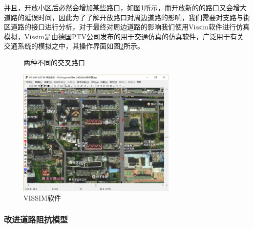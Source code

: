 \documentclass[fontset=windows,a4paper,12pt]{ctexart}
\begin{document}
			并且，开放小区后必然会增加某些路口，如图\ref{fig:cross_t}所示，而开放新的的路口又会增大道路的延误时间，因此为了了解开放路口对周边道路的影响，我们需要对支路与街区道路的接口进行分析，对于最终对周边道路的影响我们使用Vissim软件进行仿真模拟，Vissim是由德国PTV公司发布的用于交通仿真的仿真软件，广泛用于有关交通系统的模拟之中，其操作界面如图\ref{fig:vissim_ui}所示。
			\begin{figure}[!htbp]
				\centering
				\caption{两种不同的交叉路口}
				\label{fig:cross_t}
			\end{figure}
			\begin{figure}[!htbp]
				\centering
				\includegraphics[width=0.7\textwidth]{pic/vissim_ui.jpg}
				\caption{VISSIM软件}
				\label{fig:vissim_ui}
			\end{figure}
		\subsubsection{改进道路阻抗模型}
					
\end{document}
